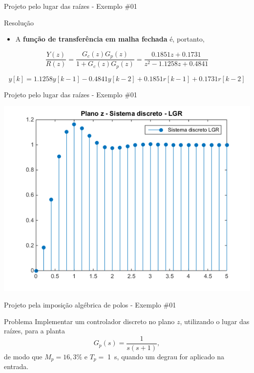 \begin{frame}{Projeto pelo lugar das raízes - Exemplo \#01}
\begin{block}{Resolução}
\begin{itemize}
    \item A \textbf{função de transferência em malha fechada} é, portanto,
\end{itemize}
$$\dfrac{Y(z)}{R(z)}=\dfrac{G_c(z)G_p(z)}{1+G_c(z)G_p(z)}=\dfrac{\num{0,1851}z+\num{0,1731}}{z^{2}-\num{1,1258}z+\num{0,4841}}$$

$$y[k]=\num{1,1258}y[k-1]-\num{0,4841}y[k-2]+\num{0,1851}r[k-1]+\num{0,1731}r[k-2]$$
\end{block}
\end{frame}

\begin{frame}{Projeto pelo lugar das raízes - Exemplo \#01}
\centerline{\includegraphics[width=0.8\linewidth]{Figuras/Ch11/fig9.png}}
\end{frame}


\begin{frame}{Projeto pela imposição algébrica de polos - Exemplo \#01}
\begin{block}{Problema}
	Implementar um controlador discreto no plano $z$, utilizando o lugar das raízes, para a planta
	$$ G_p(s)=\dfrac{1}{s(s+1)}, $$
	de modo que $ M_p=16,3\% $ e $ T_p=\; $\SI{1}{\second}, quando um degrau for aplicado na entrada.
\end{block}
\end{frame}

